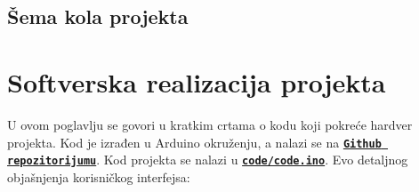 \documentclass[a4paper, 12pt]{article}
\begin{document}
\pagebreak

	\subsection*{Šema kola projekta}
	
\begin{figure}[H]
\centering
{} 
\label{fig:circuit_diagram}
\end{figure}

\vspace{10pt}

\pagebreak
\endgroup

\begingroup
\sloppy

\section{Softverska realizacija projekta}

\vspace{10pt}

U ovom poglavlju se govori u kratkim crtama o kodu koji pokreće hardver projekta. Kod je izrađen u Arduino okruženju, a nalazi se na \textbf{\texttt{\href{https://github.com/vgalovic/temperature-and-humidity-regulator.git}{Github repozitorijumu}}}. Kod projekta se nalazi u  \textbf{\texttt{\href{https://github.com/vgalovic/temperature-and-humidity-regulator/blob/main/code/code.ino}{code/code.ino}}}. Evo detaljnog objašnjenja korisničkog interfejsa:
 
\end{document}
